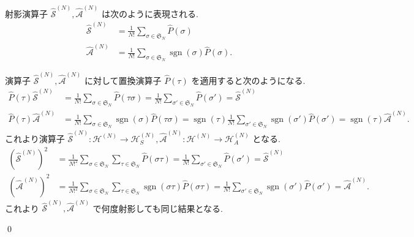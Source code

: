 \documentclass[uplatex,dvipdfmx,a4paper,11pt]{jlreq}
\makeatletter
\DeclareMathOperator{\sgn}{sgn}
\newcommand{\HH}{\mathcal{H}}
\renewcommand{\SS}{\mathfrak{S}}
\renewcommand{\S}{\mathcal{S}}
\newcommand{\A}{\mathcal{A}}
\numberwithin{equation}{section}
\theoremstyle{definition}
\renewenvironment{proof}[1][\proofname]{\par
  \normalfont
  \topsep6\p@\@plus6\p@ \trivlist
  \item[\hskip\labelsep{\bfseries #1}\@addpunct{\bfseries}]\ignorespaces\quad\par
}{
  \qed\endtrivlist\@endpefalse
}
\renewcommand\proofname{証明}
\makeatother
\begin{document}
\begin{theorem}[Q21-14(i)(ii)(iii)]
  射影演算子 $\hat{\S}^{(N)}, \hat{\A}^{(N)}$ は次のように表現される.
  \begin{align}
    \hat{\S}^{(N)} & = \frac{1}{N!}\sum_{\sigma\in\SS_N}\hat{P}(\sigma)              \\
    \hat{\A}^{(N)} & = \frac{1}{N!}\sum_{\sigma\in\SS_N}\sgn(\sigma)\hat{P}(\sigma).
  \end{align}
\end{theorem}
\begin{proof}
  演算子 $\hat{\S}^{(N)}, \hat{\A}^{(N)}$ に対して置換演算子 $\hat{P}(\tau)$ を適用すると次のようになる.
  \begin{align}
    \hat{P}(\tau)\hat{\S}^{(N)} & = \frac{1}{N!}\sum_{\sigma\in\SS_N}\hat{P}(\tau\sigma) = \frac{1}{N!}\sum_{\sigma'\in\SS_N}\hat{P}(\sigma') = \hat{\S}^{(N)}                                               \\
    \hat{P}(\tau)\hat{\A}^{(N)} & = \frac{1}{N!}\sum_{\sigma\in\SS_N}\sgn(\sigma)\hat{P}(\tau\sigma) = \sgn(\tau)\frac{1}{N!}\sum_{\sigma'\in\SS_N}\sgn(\sigma')\hat{P}(\sigma') = \sgn(\tau)\hat{\A}^{(N)}.
  \end{align}
  これより演算子 $\hat{\S}^{(N)}: \HH^{(N)}\to\HH_S^{(N)}, \hat{\A}^{(N)}: \HH^{(N)}\to\HH_A^{(N)}$ となる.
  \begin{align}
    (\hat{\S}^{(N)})^2 & = \frac{1}{N!^2}\sum_{\sigma\in\SS_N}\sum_{\tau\in\SS_N}\hat{P}(\sigma\tau) = \frac{1}{N!}\sum_{\sigma'\in\SS_N}\hat{P}(\sigma') = \hat{\S}^{(N)}                               \\
    (\hat{\A}^{(N)})^2 & = \frac{1}{N!^2}\sum_{\sigma\in\SS_N}\sum_{\tau\in\SS_N}\sgn(\sigma\tau)\hat{P}(\sigma\tau) = \frac{1}{N!}\sum_{\sigma'\in\SS_N}\sgn(\sigma')\hat{P}(\sigma') = \hat{\A}^{(N)}.
  \end{align}
  これより $\hat{\S}^{(N)}, \hat{\A}^{(N)}$ で何度射影しても同じ結果となる.
\end{proof}
\end{document}
